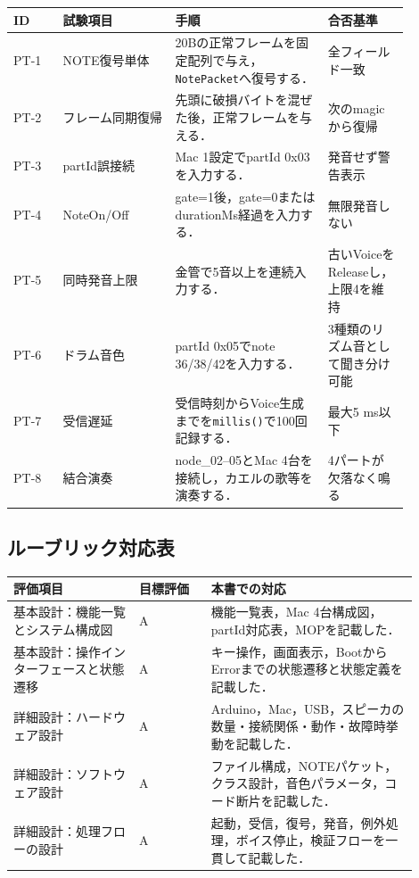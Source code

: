\documentclass[a4paper,11pt]{jsarticle}
\begin{document}
\begin{longtable}{p{0.11\linewidth}p{0.25\linewidth}p{0.34\linewidth}p{0.18\linewidth}}
\hline
ID & 試験項目 & 手順 & 合否基準 \\
\hline
\endhead
PT-1 & NOTE復号単体 & 20Bの正常フレームを固定配列で与え，\texttt{NotePacket}へ復号する． & 全フィールド一致 \\
\hline
PT-2 & フレーム同期復帰 & 先頭に破損バイトを混ぜた後，正常フレームを与える． & 次のmagicから復帰 \\
\hline
PT-3 & partId誤接続 & Mac 1設定でpartId 0x03を入力する． & 発音せず警告表示 \\
\hline
PT-4 & NoteOn/Off & gate=1後，gate=0またはdurationMs経過を入力する． & 無限発音しない \\
\hline
PT-5 & 同時発音上限 & 金管で5音以上を連続入力する． & 古いVoiceをReleaseし，上限4を維持 \\
\hline
PT-6 & ドラム音色 & partId 0x05でnote 36/38/42を入力する． & 3種類のリズム音として聞き分け可能 \\
\hline
PT-7 & 受信遅延 & 受信時刻からVoice生成までを\texttt{millis()}で100回記録する． & 最大5 ms以下 \\
\hline
PT-8 & 結合演奏 & node\_02--05とMac 4台を接続し，カエルの歌等を演奏する． & 4パートが欠落なく鳴る \\
\hline
\end{longtable}

\subsection{ルーブリック対応表}

\begin{longtable}{p{0.28\linewidth}p{0.16\linewidth}p{0.46\linewidth}}
\hline
評価項目 & 目標評価 & 本書での対応 \\
\hline
\endhead
基本設計：機能一覧とシステム構成図 & A & 機能一覧表，Mac 4台構成図，partId対応表，MOPを記載した． \\
\hline
基本設計：操作インターフェースと状態遷移 & A & キー操作，画面表示，BootからErrorまでの状態遷移と状態定義を記載した． \\
\hline
詳細設計：ハードウェア設計 & A & Arduino，Mac，USB，スピーカの数量・接続関係・動作・故障時挙動を記載した． \\
\hline
詳細設計：ソフトウェア設計 & A & ファイル構成，NOTEパケット，クラス設計，音色パラメータ，コード断片を記載した． \\
\hline
詳細設計：処理フローの設計 & A & 起動，受信，復号，発音，例外処理，ボイス停止，検証フローを一貫して記載した． \\
\hline
\end{longtable}
\end{document}
